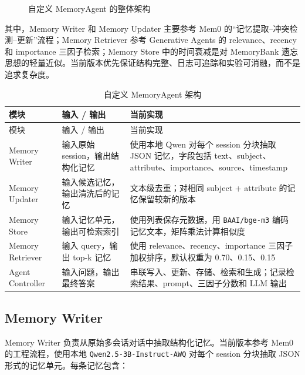 \documentclass[UTF8,a4paper,11pt]{ctexart}
\begin{document}
\begin{figure}[H]
{
}
\caption{自定义 MemoryAgent 的整体架构}
\label{fig:memory-agent-architecture}
\end{figure}

其中，Memory Writer 和 Memory Updater 主要参考 Mem0 的“记忆提取--冲突检测--更新”流程；Memory Retriever 参考 Generative Agents 的 relevance、recency 和 importance 三因子检索；Memory Store 中的时间衰减是对 MemoryBank 遗忘思想的轻量近似。当前版本优先保证结构完整、日志可追踪和实验可消融，而不是追求复杂度。

\begin{longtable}{L{2.6cm}L{4.0cm}L{6.0cm}}
\caption{自定义 MemoryAgent 架构}\\
\toprule
模块 & 输入 / 输出 & 当前实现 \\
\midrule
\endfirsthead
\toprule
模块 & 输入 / 输出 & 当前实现 \\
\midrule
\endhead
\midrule
\endfoot
\bottomrule
\endlastfoot
Memory Writer & 输入原始 session，输出结构化记忆 & 使用本地 Qwen 对每个 session 分块抽取 JSON 记忆，字段包括 text、subject、attribute、importance、source、timestamp \\
Memory Updater & 输入候选记忆，输出清洗后的记忆 & 文本级去重；对相同 subject + attribute 的记忆保留较新的版本 \\
Memory Store & 输入记忆单元，输出可检索索引 & 使用列表保存元数据，用 \texttt{BAAI/bge-m3} 编码记忆文本，矩阵乘法计算相似度 \\
Memory Retriever & 输入 query，输出 top-k 记忆 & 使用 relevance、recency、importance 三因子加权排序，默认权重为 0.70、0.15、0.15 \\
Agent Controller & 输入问题，输出最终答案 & 串联写入、更新、存储、检索和生成；记录检索结果、prompt、三因子分数和 LLM 输出 \\
\end{longtable}

\subsection{Memory Writer}

Memory Writer 负责从原始多会话对话中抽取结构化记忆。当前版本参考 Mem0 的工程流程，使用本地 \texttt{Qwen2.5-3B-Instruct-AWQ} 对每个 session 分块抽取 JSON 形式的记忆单元。每条记忆包含：
\end{document}
